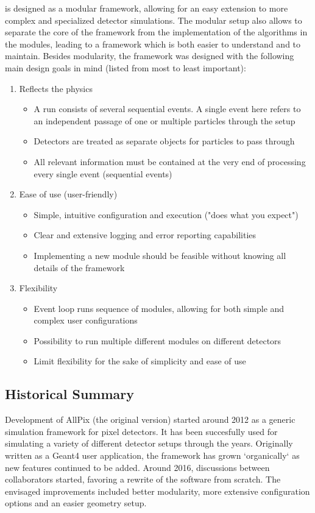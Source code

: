 \apsq is designed as a modular framework, allowing for an easy extension to more complex and specialized detector simulations.
The modular setup also allows to separate the core of the framework from the implementation of the algorithms in the modules, leading to a framework which is both easier to understand and to maintain.
Besides modularity, the \apsq framework was designed with the following main design goals in mind (listed from most to least important):
\begin{enumerate}
    \item Reflects the physics
    \begin{itemize}
        \item A run consists of several sequential events. A single event here refers to an independent passage of one or multiple particles through the setup
        \item Detectors are treated as separate objects for particles to pass through
        \item All relevant information must be contained at the very end of processing every single event (sequential events)
    \end{itemize}
    \item Ease of use (user-friendly)
    \begin{itemize}
        \item Simple, intuitive configuration and execution ("does what you expect")
        \item Clear and extensive logging and error reporting capabilities
        \item Implementing a new module should be feasible without knowing all details of the framework
    \end{itemize}
    \item Flexibility
    \begin{itemize}
        \item Event loop runs sequence of modules, allowing for both simple and complex user configurations
        \item Possibility to run multiple different modules on different detectors
        \item Limit flexibility for the sake of simplicity and ease of use
    \end{itemize}
\end{enumerate}

\subsection{Historical Summary}
Development of AllPix (the original version) started around 2012 as a generic simulation framework for pixel detectors.
It has been succesfully used for simulating a variety of different detector setups through the years.
Originally written as a Geant4 user application, the framework has grown `organically` as new features continued to be added.
Around 2016, discussions between collaborators started, favoring a rewrite of the software from scratch.
The envisaged improvements included better modularity, more extensive configuration options and an easier geometry setup.

